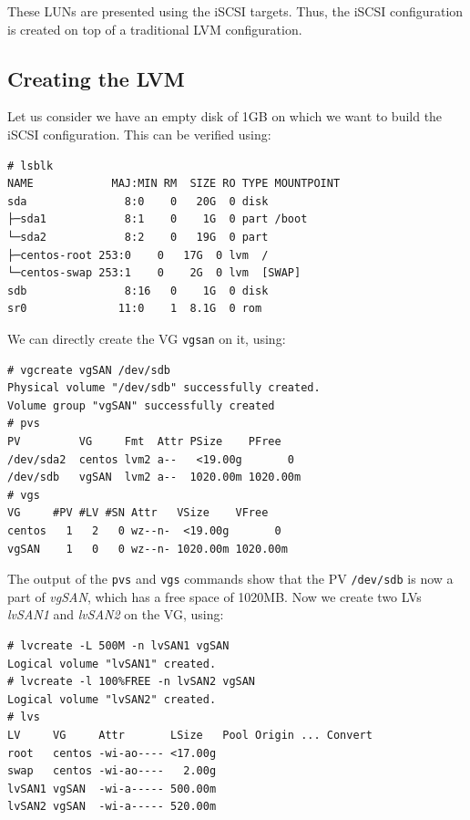 \noindent
These LUNs are presented using the iSCSI targets. Thus, the iSCSI configuration is created on top of a traditional LVM configuration. 

\subsection{Creating the LVM}
Let us consider we have an empty disk of 1GB on which we want to build the iSCSI configuration. This can be verified using:

\vspace{-15pt}
\begin{verbatim}
# lsblk
NAME            MAJ:MIN RM  SIZE RO TYPE MOUNTPOINT
sda               8:0    0   20G  0 disk 
├─sda1            8:1    0    1G  0 part /boot
└─sda2            8:2    0   19G  0 part 
├─centos-root 253:0    0   17G  0 lvm  /
└─centos-swap 253:1    0    2G  0 lvm  [SWAP]
sdb               8:16   0    1G  0 disk 
sr0              11:0    1  8.1G  0 rom  
\end{verbatim}
\vspace{-10pt}

\noindent
We can directly create the VG \verb|vgsan| on it, using:

\vspace{-15pt}
\begin{verbatim}
# vgcreate vgSAN /dev/sdb
Physical volume "/dev/sdb" successfully created.
Volume group "vgSAN" successfully created
# pvs
PV         VG     Fmt  Attr PSize    PFree   
/dev/sda2  centos lvm2 a--   <19.00g       0 
/dev/sdb   vgSAN  lvm2 a--  1020.00m 1020.00m
# vgs
VG     #PV #LV #SN Attr   VSize    VFree   
centos   1   2   0 wz--n-  <19.00g       0 
vgSAN    1   0   0 wz--n- 1020.00m 1020.00m
\end{verbatim}
\vspace{-10pt}

\noindent
The output of the \verb|pvs| and \verb|vgs| commands show that the PV \verb|/dev/sdb| is now a part of \textit{vgSAN}, which has a free space of 1020MB. Now we create two LVs \textit{lvSAN1} and \textit{lvSAN2} on the VG, using:

\vspace{-15pt}
\begin{verbatim}
# lvcreate -L 500M -n lvSAN1 vgSAN
Logical volume "lvSAN1" created.
# lvcreate -l 100%FREE -n lvSAN2 vgSAN
Logical volume "lvSAN2" created.
# lvs
LV     VG     Attr       LSize   Pool Origin ... Convert
root   centos -wi-ao---- <17.00g                                                    
swap   centos -wi-ao----   2.00g                                                    
lvSAN1 vgSAN  -wi-a----- 500.00m                                                    
lvSAN2 vgSAN  -wi-a----- 520.00m                                                    
\end{verbatim}
\vspace{-10pt}

